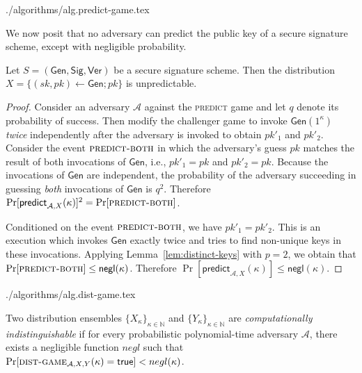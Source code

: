 {./algorithms/alg.predict-game.tex}

We now posit that no adversary can predict the public key of a secure signature scheme, except with negligible probability.

\begin{lemma}\label{lem:pk-unpredictability}
  Let $S = (\textsf{Gen}, \textsf{Sig}, \textsf{Ver})$ be a secure signature scheme.
  Then the distribution $X = \{(sk, pk) \gets \textsf{Gen}; pk\}$ is
  unpredictable.
\end{lemma}
\begin{proof}
  Consider an adversary $\mathcal{A}$ against the \textsc{predict} game and let $q$ denote its probability of success. Then modify the challenger game to invoke $\textsf{Gen}(1^\kappa)$ \emph{twice} independently after the adversary is invoked to obtain $pk'_1$ and $pk'_2$. Consider the event $\textsc{predict-both}$ in which the adversary's guess $pk$ matches the result of both invocations of $\textsf{Gen}$, i.e., $pk'_1 = pk$ and $pk'_2 = pk$.
  Because the invocations of $\textsf{Gen}$ are independent, the probability of the adversary succeeding in guessing \emph{both} invocations of $\textsf{Gen}$ is $q^2$. Therefore
  $
  \Pr[\textsf{predict}_{\mathcal{A},X}(\kappa)]^2 = \Pr[\textsc{predict-both}]
  $.

  Conditioned on the event $\textsc{predict-both}$, we have $pk'_1 = pk'_2$. This is an execution which invokes $\textsf{Gen}$ exactly twice and tries to find non-unique keys in these invocations. Applying Lemma~\ref{lem:distinct-keys} with $p = 2$, we obtain that
  $
  \Pr[\textsc{predict-both}] \leq \textsf{negl}(\kappa)
  $.
  Therefore
  $
  \Pr[\textsf{predict}_{\mathcal{A},X}(\kappa)] \leq \textsf{negl}(\kappa)
  $.
\end{proof}

{./algorithms/alg.dist-game.tex}

\begin{definition}
  Two distribution ensembles $\{X_\kappa\}_{\kappa\in\mathbb{N}}$ and $\{Y_\kappa\}_{\kappa\in\mathbb{N}}$ are
  \emph{computationally indistinguishable}
  if for every probabilistic polynomial-time adversary $\mathcal{A}$,
  there exists a negligible function $negl$ such that
  $\Pr[\textsc{dist-game}_{\mathcal{A},X,Y}(\kappa) = \mathsf{true}] < negl(\kappa)$.
\end{definition}

